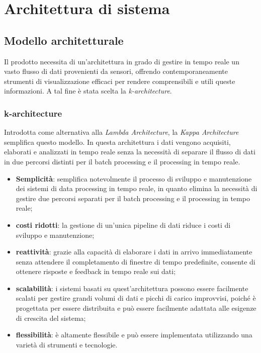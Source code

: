 \section{Architettura di sistema}
\subsection{Modello architetturale}
Il prodotto necessita di un'architettura in grado di gestire in tempo reale un vasto flusso di dati provenienti da sensori, offrendo contemporaneamente strumenti di visualizzazione efficaci per rendere comprensibili e utili queste informazioni. A tal fine è stata scelta la \textit{k-architecture}.
\subsubsection{k-architecture}
Introdotta come alternativa alla \textit{Lambda Architecture}, la \textit{Kappa Architecture} semplifica questo modello. In questa architettura i dati vengono acquisiti, elaborati e analizzati in tempo reale senza la necessità di separare il flusso di dati in due percorsi distinti per il batch processing e il processing in tempo reale. 
\begin{itemize}
    \item \textbf{Semplicità}: semplifica notevolmente il processo di sviluppo e manutenzione dei sistemi di data processing in tempo reale, in quanto elimina la necessità di gestire due percorsi separati per il batch processing e il processing in tempo reale;
    \item \textbf{costi ridotti}: la gestione di un'unica pipeline di dati riduce i costi di sviluppo e manutenzione;
    \item \textbf{reattività}: grazie alla capacità di elaborare i dati in arrivo immediatamente senza attendere il completamento di finestre di tempo predefinite, consente di ottenere risposte e feedback in tempo reale sui dati;
    \item \textbf{scalabilità}: i sistemi basati su quest'architettura possono essere facilmente scalati per gestire grandi volumi di dati e picchi di carico improvvisi, poiché è progettata per essere distribuita e può essere facilmente adattata alle esigenze di crescita del sistema;
    \item \textbf{flessibilità}: è altamente flessibile e può essere implementata utilizzando una varietà di strumenti e tecnologie.
\end{itemize}
